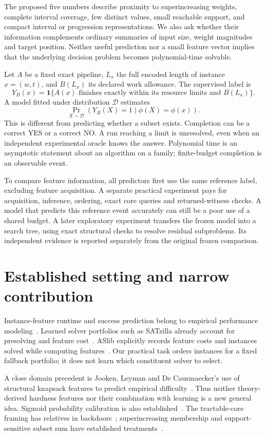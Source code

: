 \documentclass[10pt,english]{article}
\begin{document}
The proposed five numbers describe proximity to superincreasing weights, complete interval coverage, few distinct values, small reachable support, and compact interval or progression representations. We also ask whether their information complements ordinary summaries of input size, weight magnitudes and target position. Neither useful prediction nor a small feature vector implies that the underlying decision problem becomes polynomial-time solvable.

Let \(A\) be a fixed exact pipeline, \(L_x\) the full encoded length of instance \(x=(w,t)\), and \(B(L_x)\) its declared work allowance. The supervised label is
\[
Y_B(x)=\mathbf 1\{A(x)\text{ finishes exactly within its resource limits and }B(L_x)\}.
\]
A model fitted under distribution \(\mathcal D\) estimates
\[
\Pr_{X\sim\mathcal D}\!\left(Y_B(X)=1\mid\phi(X)=\phi(x)\right).
\]
This is different from predicting whether a subset exists. Completion can be a correct YES or a correct NO. A run reaching a limit is unresolved, even when an independent experimental oracle knows the answer. Polynomial time is an asymptotic statement about an algorithm on a family; finite-budget completion is an observable event.

To compare feature information, all predictors first use the same reference label, excluding feature acquisition. A separate practical experiment pays for acquisition, inference, ordering, exact core queries and returned-witness checks. A model that predicts this reference event accurately can still be a poor use of a shared budget. A later exploratory experiment transfers the frozen model into a search tree, using exact structural checks to resolve residual subproblems. Its independent evidence is reported separately from the original frozen comparison.

\section{Established setting and narrow contribution}
Instance-feature runtime and success prediction belong to empirical performance modeling~\cite{hutter}. Learned solver portfolios such as SATzilla already account for presolving and feature cost~\cite{satzilla}. ASlib explicitly records feature costs and instances solved while computing features~\cite{aslib}. Our practical task orders instances for a fixed fallback portfolio; it does not learn which constituent solver to select.

A close domain precedent is Jooken, Leyman and De Causmaecker's use of structural knapsack features to predict empirical difficulty~\cite{jooken}. Thus neither theory-derived hardness features nor their combination with learning is a new general idea. Sigmoid probability calibration is also established~\cite{calibration}. The tractable-core framing has relatives in backdoors~\cite{backdoors}; superincreasing membership and support-sensitive subset sum have established treatments~\cite{sage,support}.
\end{document}
